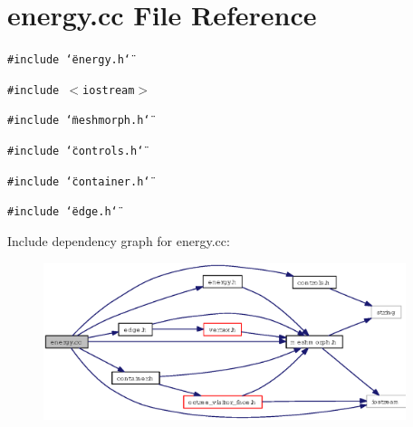 \section{energy.cc File Reference}
\label{energy_8cc}
{\tt \#include \char`\"{}energy.h\char`\"{}}\par
{\tt \#include $<$iostream$>$}\par
{\tt \#include \char`\"{}meshmorph.h\char`\"{}}\par
{\tt \#include \char`\"{}controls.h\char`\"{}}\par
{\tt \#include \char`\"{}container.h\char`\"{}}\par
{\tt \#include \char`\"{}edge.h\char`\"{}}\par


Include dependency graph for energy.cc:\begin{figure}[H]
\begin{center}
\leavevmode
\includegraphics[width=300pt]{energy_8cc__incl}
\end{center}
\end{figure}
